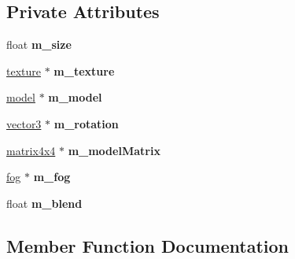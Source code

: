 \subsection*{Private Attributes}
\begin{DoxyCompactItemize}
\item 
\mbox{\label{classflounder_1_1skybox_a86732f5bf985dbade5e0267b00864146}} 
float {\bfseries m\+\_\+size}
\item 
\mbox{\label{classflounder_1_1skybox_a7f446515bdea0a6341fac3f961e9707b}} 
\hyperlink{classflounder_1_1texture}{texture} $\ast$ {\bfseries m\+\_\+texture}
\item 
\mbox{\label{classflounder_1_1skybox_a8533ad0cefb38d6868f415656aaf14b3}} 
\hyperlink{classflounder_1_1model}{model} $\ast$ {\bfseries m\+\_\+model}
\item 
\mbox{\label{classflounder_1_1skybox_a7ca62d998df7042053987dfb219500fc}} 
\hyperlink{classflounder_1_1vector3}{vector3} $\ast$ {\bfseries m\+\_\+rotation}
\item 
\mbox{\label{classflounder_1_1skybox_a149b6fde2e5d6c91cbb7dda23e018660}} 
\hyperlink{classflounder_1_1matrix4x4}{matrix4x4} $\ast$ {\bfseries m\+\_\+model\+Matrix}
\item 
\mbox{\label{classflounder_1_1skybox_a0359e93148997f9d0ae2afb83cd38faa}} 
\hyperlink{classflounder_1_1fog}{fog} $\ast$ {\bfseries m\+\_\+fog}
\item 
\mbox{\label{classflounder_1_1skybox_a09c5b61727e96dfd822d95255d23badc}} 
float {\bfseries m\+\_\+blend}
\end{DoxyCompactItemize}


\subsection{Member Function Documentation}
\mbox{\label{classflounder_1_1skybox_a4d6b3b6d783e4ad3d3f060cbd0e04e7c}} 

